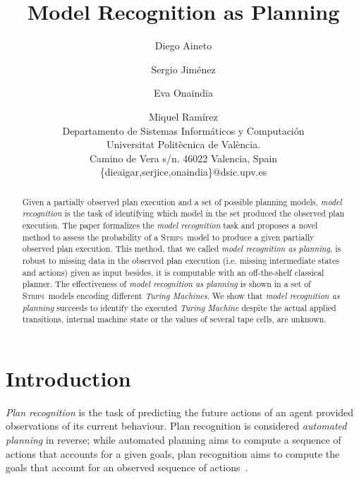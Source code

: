 \documentclass[letterpaper]{article} %
\newcommand{\strips}{\textsc{Strips}}     %
\begin{document}
\title{Model Recognition as Planning}

\author{Diego Aineto\and Sergio Jim\'enez\and Eva Onaindia \and Miquel Ram\'irez\\
{\small Departamento de Sistemas Inform\'aticos y Computaci\'on}\\
{\small Universitat Polit\`ecnica de Val\`encia.}\\
{\small Camino de Vera s/n. 46022 Valencia, Spain}\\
{\small \{dieaigar,serjice,onaindia\}@dsic.upv.es}}



\maketitle
\begin{abstract} 
Given a partially observed plan execution and a set of possible planning models, {\em model recognition} is the task of identifying which model in the set produced the observed plan execution. The paper formalizes the {\em model recognition} task and proposes a novel method to assess the probability of a \strips\ model to produce a given partially observed plan execution. This method, that we called {\em model recognition as planning}, is robust to missing data in the observed plan execution (i.e. missing intermediate states and actions) given as input besides, it is computable with an off-the-shelf classical planner. The effectiveness of {\em model recognition as planning} is shown in a set of \strips\ models encoding different {\em Turing Machines}. We show that {\em model recognition as planning} succeeds to identify the executed {\em Turing Machine} despite the actual applied transitions, internal machine state or the values of several tape cells, are unknown.
\end{abstract}


\section{Introduction}
\label{sec:introduction}
{\em Plan recognition} is the task of predicting the future actions of an agent provided observations of its current behaviour. Plan recognition is considered {\em automated planning} in reverse; while automated planning aims to compute a sequence of actions that accounts for a given goals, plan recognition aims to compute the goals that account for an observed sequence of actions~\cite{geffner:book:2013}.
\end{document}
